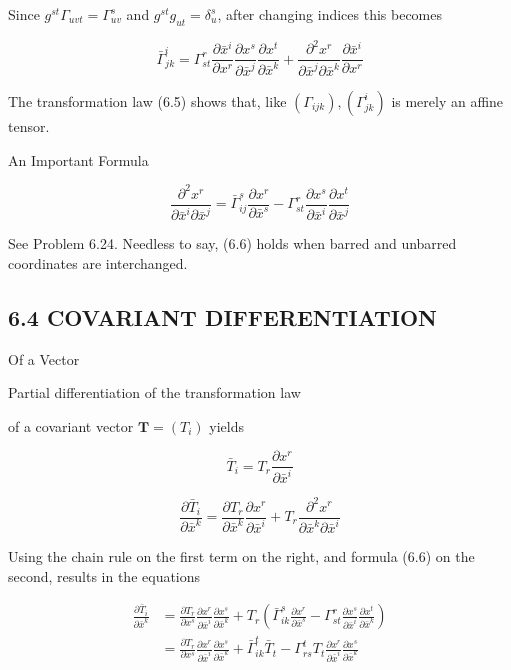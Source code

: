 \documentclass[10pt]{article}
\begin{document}
Since $g^{s t} \Gamma_{u v t}=\Gamma_{u v}^{s}$ and $g^{s t} g_{u t}=\delta_{u}^{s}$, after changing indices this becomes


\begin{equation*}
\bar{\Gamma}_{j k}^{i}=\Gamma_{s t}^{r} \frac{\partial \bar{x}^{i}}{\partial x^{r}} \frac{\partial x^{s}}{\partial \bar{x}^{j}} \frac{\partial x^{t}}{\partial \bar{x}^{k}}+\frac{\partial^{2} x^{r}}{\partial \bar{x}^{j} \partial \bar{x}^{k}} \frac{\partial \bar{x}^{i}}{\partial x^{r}} \tag{6.5}
\end{equation*}


The transformation law (6.5) shows that, like $\left(\Gamma_{i j k}\right),\left(\Gamma_{j k}^{i}\right)$ is merely an affine tensor.

An Important Formula


\begin{equation*}
\frac{\partial^{2} x^{r}}{\partial \bar{x}^{i} \partial \bar{x}^{j}}=\bar{\Gamma}_{i j}^{s} \frac{\partial x^{r}}{\partial \bar{x}^{s}}-\Gamma_{s t}^{r} \frac{\partial x^{s}}{\partial \bar{x}^{i}} \frac{\partial x^{t}}{\partial \bar{x}^{j}} \tag{6.6}
\end{equation*}


See Problem 6.24. Needless to say, (6.6) holds when barred and unbarred coordinates are interchanged.

\subsection*{6.4 COVARIANT DIFFERENTIATION}
Of a Vector

Partial differentiation of the transformation law

of a covariant vector $\mathbf{T}=\left(T_{i}\right)$ yields

$$
\bar{T}_{i}=T_{r} \frac{\partial x^{r}}{\partial \bar{x}^{i}}
$$

$$
\frac{\partial \bar{T}_{i}}{\partial \bar{x}^{k}}=\frac{\partial T_{r}}{\partial \bar{x}^{k}} \frac{\partial x^{r}}{\partial \bar{x}^{i}}+T_{r} \frac{\partial^{2} x^{r}}{\partial \bar{x}^{k} \partial \bar{x}^{i}}
$$

Using the chain rule on the first term on the right, and formula (6.6) on the second, results in the equations

$$
\begin{aligned}
\frac{\partial \bar{T}_{i}}{\partial \bar{x}^{k}} & =\frac{\partial T_{r}}{\partial x^{s}} \frac{\partial x^{r}}{\partial \bar{x}^{i}} \frac{\partial x^{s}}{\partial \bar{x}^{k}}+T_{r}\left(\bar{\Gamma}_{i k}^{s} \frac{\partial x^{r}}{\partial \bar{x}^{s}}-\Gamma_{s t}^{r} \frac{\partial x^{s}}{\partial \bar{x}^{i}} \frac{\partial x^{t}}{\partial \bar{x}^{k}}\right) \\
& =\frac{\partial T_{r}}{\partial x^{s}} \frac{\partial x^{r}}{\partial \bar{x}^{i}} \frac{\partial x^{s}}{\partial \bar{x}^{k}}+\bar{\Gamma}_{i k}^{t} \bar{T}_{t}-\Gamma_{r s}^{t} T_{t} \frac{\partial x^{r}}{\partial \bar{x}^{i}} \frac{\partial x^{s}}{\partial \bar{x}^{k}}
\end{aligned}
$$
\end{document}
